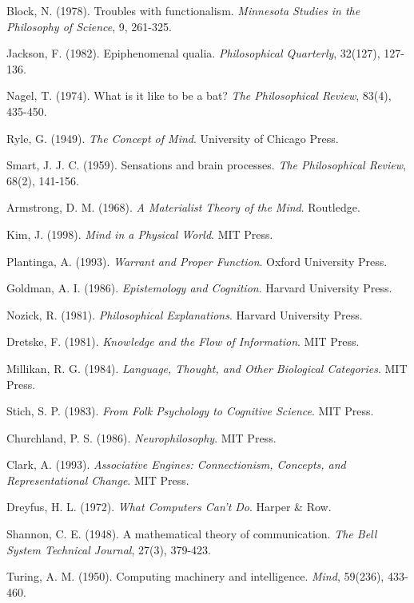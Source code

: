 \documentclass[12pt,a4paper]{article}
\begin{document}
\begin{thebibliography}{99}
Block, N. (1978). Troubles with functionalism. \textit{Minnesota Studies in the Philosophy of Science}, 9, 261-325.

Jackson, F. (1982). Epiphenomenal qualia. \textit{Philosophical Quarterly}, 32(127), 127-136.

Nagel, T. (1974). What is it like to be a bat? \textit{The Philosophical Review}, 83(4), 435-450.

Ryle, G. (1949). \textit{The Concept of Mind}. University of Chicago Press.

Smart, J. J. C. (1959). Sensations and brain processes. \textit{The Philosophical Review}, 68(2), 141-156.

Armstrong, D. M. (1968). \textit{A Materialist Theory of the Mind}. Routledge.

Kim, J. (1998). \textit{Mind in a Physical World}. MIT Press.

Plantinga, A. (1993). \textit{Warrant and Proper Function}. Oxford University Press.

Goldman, A. I. (1986). \textit{Epistemology and Cognition}. Harvard University Press.

Nozick, R. (1981). \textit{Philosophical Explanations}. Harvard University Press.

Dretske, F. (1981). \textit{Knowledge and the Flow of Information}. MIT Press.

Millikan, R. G. (1984). \textit{Language, Thought, and Other Biological Categories}. MIT Press.

Stich, S. P. (1983). \textit{From Folk Psychology to Cognitive Science}. MIT Press.

Churchland, P. S. (1986). \textit{Neurophilosophy}. MIT Press.

Clark, A. (1993). \textit{Associative Engines: Connectionism, Concepts, and Representational Change}. MIT Press.

Dreyfus, H. L. (1972). \textit{What Computers Can't Do}. Harper & Row.

Shannon, C. E. (1948). A mathematical theory of communication. \textit{The Bell System Technical Journal}, 27(3), 379-423.

Turing, A. M. (1950). Computing machinery and intelligence. \textit{Mind}, 59(236), 433-460.


\end{thebibliography}
\end{document}
